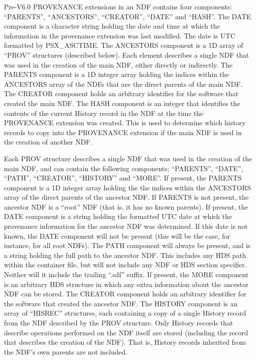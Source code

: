\documentclass[twoside,11pt,nolof]{starlink}
\begin{document}
Pre-V6.0 PROVENANCE extensions in an NDF contains four components:
``PARENTS'', ``ANCESTORS'', ``CREATOR'', ``DATE'' and ``HASH''. The DATE
component is a character string holding the date and time at which the
information in the provenance extension was last modified. The date is
UTC formatted by PSX\_ASCTIME. The ANCESTORS component is a 1D array of
``PROV'' structures (described below). Each element describes a single
NDF that was used in the creation of the main NDF, either directly or
indirectly. The PARENTS component is a 1D integer array holding the
indices within the ANCESTORS array of the NDFs that are the direct
parents of the main NDF. The CREATOR component holds an arbitrary
identifier for the software that created the main NDF. The HASH component
is an integer that identifies the contents of the current History record
in the NDF at the time the PROVENANCE extension was created. This is used
to determine which history records to copy into the PROVENANCE extension
if the main NDF is used in the creation of another NDF.

Each PROV structure describes a single NDF that was used in the creation
of the main NDF, and can contain the following components; ``PARENTS'',
``DATE'', ``PATH'', ``CREATOR'', ``HISTORY'' and ``MORE''. If present, the PARENTS
component is a 1D integer array holding the the indices within the
ANCESTORS array of the direct parents of the ancestor NDF. If PARENTS is
not present, the ancestor NDF is a ``root'' NDF (that is, it has no known
parents). If present, the DATE component is a string holding the
formatted UTC date at which the provenance information for the ancestor
NDF was determined. If this date is not known, the DATE component will
not be present (this will be the case, for instance, for all root NDFs).
The PATH component will always be present, and is a string holding the
full path to the ancestor NDF. This includes any HDS path within the
container file, but will not include any NDF or HDS section specifier.
Neither will it include the trailing ``.sdf'' suffix. If present, the MORE
component is an arbitrary HDS structure in which any extra information
about the ancestor NDF can be stored. The CREATOR component holds an
arbitrary identifier for the software that created the ancestor NDF. The
HISTORY component is an array of ``HISREC'' structures, each containing a
copy of a single History record from the NDF described by the PROV
structure. Only History records that describe operations performed on the
NDF itself are stored (including the record that describes the creation
of the NDF). That is, History records inherited from the NDF's own
parents are not included.
\end{document}
